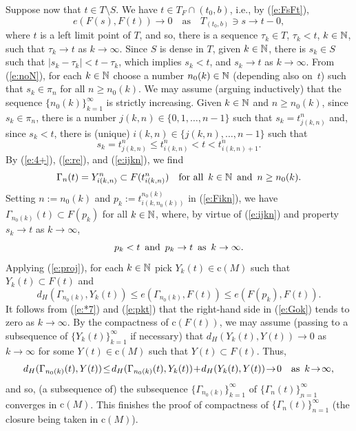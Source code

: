 \documentclass[preprint,12pt]{elsarticle}
\newcommand{\eq}[1]{\mbox{\rm(\ref{#1})}}
\newcommand{\ov}[1]{\overline{#1}}
\begin{document}
\begin{pfBV}
Suppose now that $t\in T\setminus S$. We have $t\in T_F\cap(t_0,b)$, i.e., by \eq{e:FsFt},
  \begin{equation} \label{e:*7}
e(F(s),F(t))\to0\quad\mbox{as}\quad T_{(t_0,b)}\ni s\to t-0,
  \end{equation}
where $t$ is a left limit point of $T$, and so,
there is a sequence $\tau_k\in T$, $\tau_k<t$, $k\in\mathbb{N}$, such that $\tau_k\to t$
as $k\to\infty$. Since $S$ is dense in $T$, given $k\in\mathbb{N}$, there is $s_k\in S$ such
that $|s_k-\tau_k|<t-\tau_k$, which implies $s_k<t$, and $s_k\to t$ as $k\to\infty$.
From \eq{e:noN}, for each $k\in\mathbb{N}$ choose a number $n_0(k)\in\mathbb{N}$ (depending
also on~$t$) such that $s_k\in\pi_n$ for all $n\ge n_0(k)$. We may assume (arguing
inductively) that the sequence $\{n_0(k)\}_{k=1}^\infty$ is strictly increasing.
Given $k\in\mathbb{N}$ and $n\ge n_0(k)$, since $s_k\in\pi_n$, there is a number
$j(k,n)\in\{0,1,\dots,n-1\}$ such that $s_k=t_{j(k,n)}^n$ and, since $s_k<t$, there is
(unique) $i(k,n)\in\{j(k,n),\dots,n-1\}$ such that
  \begin{equation} \label{e:ijkn}
s_k=t_{j(k,n)}^n\le t_{i(k,n)}^n<t<t_{i(k,n)+1}^n.
  \end{equation}
By \eq{e:4+}, \eq{e:re}, and \eq{e:ijkn}, we find
  \begin{equation} \label{e:Fikn}
\Gamma_n(t)=Y_{i(k,n)}^n\subset F(t_{i(k,n)}^n)\quad\mbox{for all \,$k\in\mathbb{N}$
  \,and \,$n\ge n_0(k)$.}
  \end{equation}
Setting $n:=n_0(k)$ and $p_k:=t_{i(k,n_0(k))}^{n_0(k)}$ in \eq{e:Fikn}, we have
$\Gamma_{n_0(k)}(t)\subset F(p_k)$ for all $k\in\mathbb{N}$, where, by virtue of \eq{e:ijkn}
and property $s_k\to t$ as $k\to\infty$,
  \begin{equation} \label{e:pkt}
\mbox{$p_k<t$ \,and \,$p_k\to t$ \,as \,$k\to\infty$.}
  \end{equation}
Applying \eq{e:proj}, for each $k\in\mathbb{N}$ pick $Y_k(t)\in\mbox{c}(M)$ such that
$Y_k(t)\subset F(t)$ and
  \begin{equation} \label{e:Gok}
d_H(\Gamma_{n_0(k)},Y_k(t))\le e(\Gamma_{n_0(k)},F(t))\le e(F(p_k),F(t)).
  \end{equation}
It follows from \eq{e:*7} and \eq{e:pkt} that the right-hand side in \eq{e:Gok} tends
to zero as $k\to\infty$. By the compactness of $\mbox{c}(F(t))$, we may assume
(passing to a subsequence of $\{Y_k(t)\}_{k=1}^\infty$ if necessary) that
$d_H(Y_k(t),Y(t))\to0$ as $k\to\infty$ for some $Y(t)\in\mbox{c}(M)$ such that
$Y(t)\subset F(t)$. Thus,
  \begin{equation*}
d_H(\Gamma_{n_0(k)}(t),Y(t))\!\le\! d_H(\Gamma_{n_0(k)}(t),Y_k(t))
  \!+\!d_H(Y_k(t),Y(t))\!\to\!0\quad\mbox{as \,$k\!\to\!\infty$,}
  \end{equation*}
and so, (a subsequence of) the subsequence $\{\Gamma_{n_0(k)}\}_{k=1}^\infty$
of $\{\Gamma_n(t)\}_{n=1}^\infty$ converges in $\mbox{c}(M)$. This finishes
the proof of compactness of $\ov{\{\Gamma_n(t)\}_{n=1}^\infty}$ (the closure
being taken in $\mbox{c}(M)$).


\end{pfBV}
\end{document}
